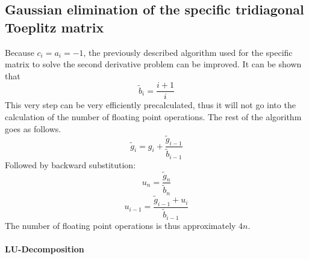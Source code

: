 \documentclass[10pt,a4paper]{article}
\begin{document}
\subsection{Gaussian elimination of the specific tridiagonal Toeplitz matrix}

Because $c_i=a_i=-1$, the previously described algorithm used for the specific matrix  to solve the second derivative problem can be improved. It can be shown that 
$$\tilde{b}_i=\frac{i+1}{i}$$
This very step can be very efficiently precalculated, thus it will not go into the calculation of the number of floating point operations. The rest of the algorithm goes as follows.
$$\tilde{g}_i=g_i+\frac{\tilde{g}_{i-1}}{\tilde{b}_{i-1}} $$
Followed by backward substitution:
$$u_n = \frac{\tilde{g}_n}{\tilde{b}_n}$$
$$u_{i-1} = \frac{\tilde{g}_{i-1}+u_i}{\tilde{b}_{i-1}}$$
The number of floating point operations is thus approximately $4n$.\\

\paragraph{LU-Decomposition}
\end{document}
